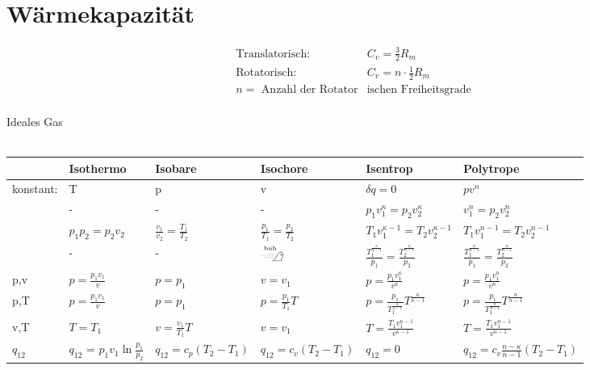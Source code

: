 \documentclass[twocolumn]{article}
\begin{document}
\section{Wärmekapazität}

\begin{align*}
	\text{Translatorisch: }  &C_v = \frac{3}{2} R_m  \\
	 \text{Rotatorisch: }  &C_v = n \cdot \frac{1}{2} R_m \\
	 n = \text{ Anzahl der Rotator} & \text{ischen Freiheitsgrade} \\
\end{align*}

\onecolumn
\begin{landscape}
	\large
	Ideales Gas \\\\
	\renewcommand{\arraystretch}{2.5}
\begin{tabular}{l|l|l|l|l|l}
	 & Isothermo  & Isobare  & Isochore  & Isentrop  & Polytrope \\ \hline
	konstant:  & T  & p  & v  & $\delta q=0$  & $pv^n$  \\ \hline
	& -  & -  & -  & $p_1 v_1^{\kappa} = p_2 v_2^{\kappa}$  & $v_1^{n} = p_2 v_2^{n}$  \\ \hline
& $p_1 p_2 = p_2 v_2$  & $\frac{v_1}{v_2} = \frac{T_1}{T_2}$  & $\frac{p_1}{T_1} = \frac{p_2}{T_2}$  & $T_1 v_1^{\kappa - 1} = T_2 v_2^{\kappa -1}$   & $T_1 v_1^{n - 1} = T_2 v_2^{n -1}$  \\ \hline
	& -  & -  & $\xrightswishingghost{\text{\tiny buh}}$  & $\frac{T_1^{\frac{\kappa}{\kappa -1}}}{p_1} = \frac{T_2^{\frac{\kappa}{\kappa -1}}}{p_2}$  & $\frac{T_1^{\frac{n}{n -1}}}{p_1} = \frac{T_2^{\frac{n}{n -1}}}{p_2}$  \\ \hline
p,v & $p = \frac{p_1 v_1}{v}$  & $p = p_1$  & $v = v_1$  & $p = \frac{p_1 v_1^{\kappa}}{v^{\kappa}}$  &  $p = \frac{p_1 v_1^{n}}{v^{n}}$ \\ \hline
p,T & $p = \frac{p_1 v_1}{v}$  & $p = p_1$  & $p = \frac{p_1}{T_1}T$  & $p = \frac{p_1}{T_1^{\frac{\kappa}{\kappa -1}}} T^{\frac{\kappa}{\kappa -1}}$  &  $p = \frac{p_1}{T_1^{\frac{n}{n -1}}} T^{\frac{n}{n -1}}$\\ \hline
v,T  & $T = T_1$  & $v = \frac{v_1}{T_1}T$  & $v = v_1 $ & $T = \frac{T_1 v_1^{\kappa - 1}}{v^{\kappa - 1}}$  & $T = \frac{T_1v_1^{n-1}}{v^{n-1}}  $\\ \hline
$q_{12}$	& $q_{12}$ = $p_1v_1 \ln \frac{p_1}{p_2}$  & $q_{12} = c_p(T_2 - T_1)$   & $q_{12} = c_v(T_2 - T_1)$  & $q_{12} = 0$   &  $q_{12} = c_v \frac{n-\kappa}{n-1}(T_2-T_1)$ \\ \hline

\end{tabular}
\end{landscape}
\end{document}
